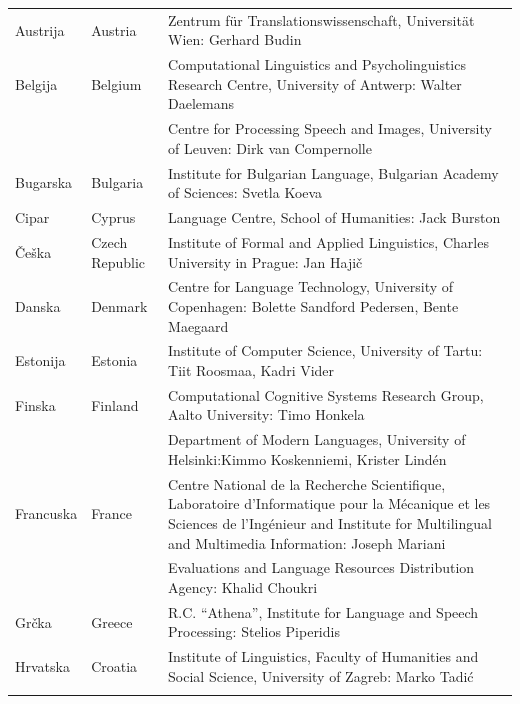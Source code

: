 \small
\begin{longtable}{llp{115mm}}
 Austrija & \textcolor{grey1}{Austria} & Zentrum für Translationswissenschaft, Universität Wien: Gerhard Budin\\ \addlinespace 
  Belgija & \textcolor{grey1}{Belgium} & Computational Linguistics and Psycholinguistics Research Centre, University of Antwerp: Walter Daelemans\\ \addlinespace
  & & Centre for Processing Speech and Images, University of Leuven: Dirk van Compernolle \\ \addlinespace
  Bugarska & \textcolor{grey1}{Bulgaria} & Institute for Bulgarian Language, Bulgarian Academy of Sciences: Svetla Koeva \\ \addlinespace
  Cipar & \textcolor{grey1}{Cyprus} & Language Centre, School of Humanities: Jack Burston\\ \addlinespace 
  Češka & \textcolor{grey1}{Czech Republic} & Institute of Formal and Applied Linguistics, Charles University in Prague: Jan Hajič \\ \addlinespace
  Danska &  \textcolor{grey1}{Denmark} & Centre for Language Technology, University of Copenhagen: \newline Bolette Sandford Pedersen, Bente Maegaard\\ \addlinespace
  Estonija & \textcolor{grey1}{Estonia} & Institute of Computer Science, University of Tartu: Tiit Roosmaa, Kadri Vider\\ \addlinespace
  Finska & \textcolor{grey1}{Finland} & Computational Cognitive Systems Research Group, Aalto University: Timo Honkela\\ \addlinespace
  & & Department of Modern Languages, University of Helsinki:\newline Kimmo Koskenniemi, Krister Lindén \\ \addlinespace
  Francuska & \textcolor{grey1}{France} & Centre National de la Recherche Scientifique, Laboratoire d'Informatique pour la Mécanique et les Sciences de l'Ingénieur and Institute for Multilingual and Multimedia Information: Joseph Mariani \\ \addlinespace
  & & Evaluations and Language Resources Distribution Agency: Khalid Choukri\\ \addlinespace 
  Grčka & \textcolor{grey1}{Greece} & R.C. “Athena”, Institute for Language and Speech Processing: Stelios Piperidis\\ \addlinespace 
  Hrvatska & \textcolor{grey1}{Croatia} & Institute of Linguistics, Faculty of Humanities and Social Science, University of Zagreb: Marko Tadić \\ \addlinespace

\end{longtable}
